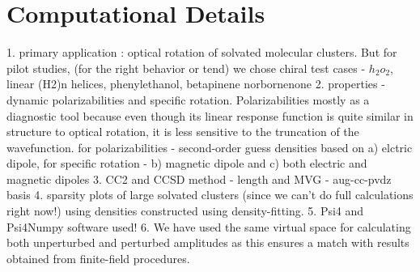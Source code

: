 \section{Computational Details}
1. primary application : optical rotation of solvated molecular clusters. But for pilot studies,
   (for the right behavior or tend)
   we chose chiral test cases - $h_2o_2$, linear (H2)n helices, phenylethanol, betapinene
   norbornenone 
2. properties - dynamic polarizabilities 
   and specific rotation. Polarizabilities mostly as a diagnostic tool
   because even though its linear response function is quite similar in structure
   to optical rotation, it is less sensitive to the truncation of the wavefunction.
  for polarizabilities - second-order guess densities based on a) elctric dipole,
  for specific rotation - b) magnetic dipole and c) both electric and magnetic dipoles
3. CC2 and CCSD method  - length and MVG - aug-cc-pvdz basis
4. sparsity plots of large solvated clusters (since we can't do full calculations 
	right now!) using densities constructed using density-fitting.
5. Psi4 and Psi4Numpy software used!
6. We have used the same virtual space for calculating both unperturbed and 
perturbed amplitudes as this ensures a match with results obtained 
from finite-field procedures.

%
